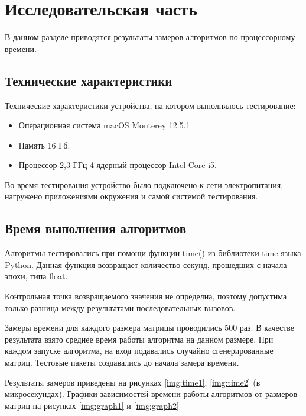 \chapter{Исследовательская часть}

В данном разделе приводятся результаты замеров алгоритмов по процессорному времени.

\section{Технические характеристики}

Технические характеристики устройства, на котором выполнялось тестирование:

\begin{itemize}
	\item Операционная система macOS Monterey 12.5.1 
	\item Память 16 Гб.
	\item Процессор 2,3 ГГц 4‑ядерный процессор Intel Core i5.
\end{itemize}

Во время тестирования устройство было подключено к сети электропитания, нагружено приложениями окружения и самой  системой тестирования.

\section{Время выполнения алгоритмов}

Алгоритмы тестировались при помощи функции time() из библиотеки time языка Python. Данная функция возвращает количество секунд, прошедших с начала эпохи, типа float.

Контрольная точка возвращаемого значения не определна, поэтому допустима только разница между результатами последовательных вызовов.

Замеры времени для каждого размера матрицы проводились 500 раз. В качестве результата взято среднее время работы алгоритма на данном размере. При каждом запуске алгоритма, на вход подавались случайно сгенерированные матриц. Тестовые пакеты создавались до начала замера времени.

Результаты замеров приведены на рисунках \ref{img:time1}, \ref{img:time2} (в микросекундах). Графики зависимостей времени работы алгоритмов от размеров матриц на рисунках \ref{img:graph1} и \ref{img:graph2}


